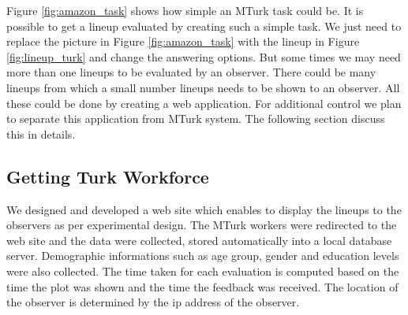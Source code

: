 \documentclass[11pt]{article}
\begin{document}
Figure \ref{fig:amazon_task} shows how simple an MTurk task could be. It is possible to get a lineup evaluated by creating such a simple task. We just need to replace the picture in Figure \ref{fig:amazon_task} with the lineup in Figure \ref{fig:lineup_turk} and change the answering options. But some times we may need more than one lineups to be evaluated by an observer. There could be many lineups from which a small number lineups needs to be shown to an observer. All these could be done by creating a web application. For additional control we plan to separate this application from MTurk system. The following section discuss this in details.





\subsection{Getting Turk Workforce}

We designed and developed a web site which enables to display the lineups to the observers as per experimental design. The MTurk workers were redirected to the web site and the data were collected, stored automatically into a local database server. Demographic informations such as age group, gender and education levels were also collected. The time taken for each evaluation is computed based on the time the plot was shown and the time the feedback was received. The location of the observer is determined by the ip address of the observer.
\end{document}

